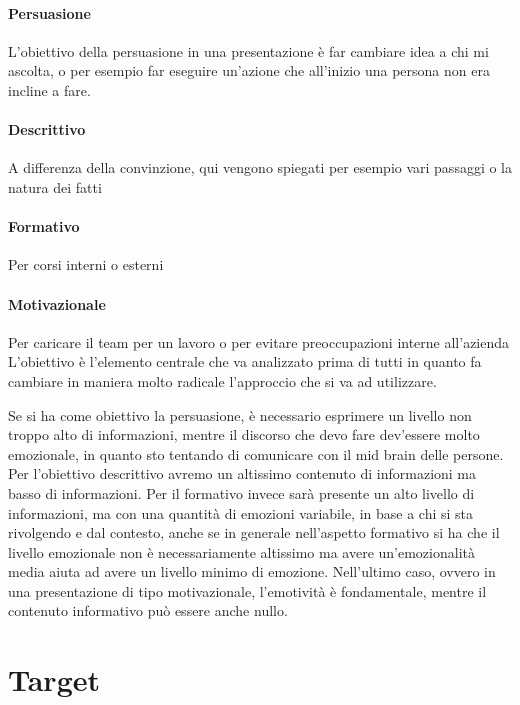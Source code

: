 \paragraph*{Persuasione} L'obiettivo della persuasione in una presentazione è
far cambiare idea a chi mi ascolta, o per esempio far eseguire un'azione che
all'inizio una persona non era incline a fare.

\paragraph*{Descrittivo} A differenza della convinzione, qui vengono spiegati
per esempio vari passaggi o la natura dei fatti

\paragraph*{Formativo} Per corsi interni o esterni

\paragraph*{Motivazionale} Per caricare il team per un lavoro o per evitare
preoccupazioni interne all'azienda\\[0.3cm]

L'obiettivo è l'elemento centrale che va analizzato prima di tutti in quanto fa
cambiare in maniera molto radicale l'approccio che si va ad utilizzare.

Se si ha come obiettivo la persuasione, è necessario esprimere un livello non
troppo alto di informazioni, mentre il discorso che devo fare dev'essere molto
emozionale, in quanto sto tentando di comunicare con il mid brain delle
persone. Per l'obiettivo descrittivo avremo un altissimo contenuto di
informazioni ma basso di informazioni. Per il formativo invece sarà presente un
alto livello di informazioni, ma con una quantità di emozioni variabile, in base
a chi si sta rivolgendo e dal contesto, anche se in generale nell'aspetto
formativo si ha che il livello emozionale non è necessariamente altissimo ma
avere un'emozionalità media aiuta ad avere un livello minimo di emozione.
Nell'ultimo caso, ovvero in una presentazione di tipo motivazionale,
l'emotività è fondamentale, mentre il contenuto informativo può essere anche
nullo.

\section{Target}

